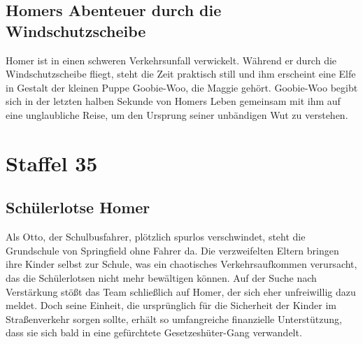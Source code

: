 
\subsection{Homers Abenteuer durch die Windschutzscheibe}\label{OABF13}
Homer ist in einen schweren Verkehrsunfall verwickelt. Während er durch die Windschutzscheibe fliegt, steht die Zeit praktisch still und ihm erscheint eine Elfe in Gestalt der kleinen Puppe Goobie-Woo, die Maggie gehört. Goobie-Woo begibt sich in der letzten halben Sekunde von Homers Leben gemeinsam mit ihm auf eine unglaubliche Reise, um den Ursprung seiner unbändigen Wut zu verstehen.


\section{Staffel 35}

\subsection{Schülerlotse Homer}
Als Otto, der Schulbusfahrer, plötzlich spurlos verschwindet, steht die Grundschule von Springfield ohne Fahrer da. Die verzweifelten Eltern bringen ihre Kinder selbst zur Schule, was ein chaotisches Verkehrsaufkommen verursacht, das die Schülerlotsen nicht mehr bewältigen können. Auf der Suche nach Verstärkung stößt das Team schließlich auf Homer, der sich eher unfreiwillig dazu meldet. Doch seine Einheit, die ursprünglich für die Sicherheit der Kinder im Straßenverkehr sorgen sollte, erhält so umfangreiche finanzielle Unterstützung, dass sie sich bald in eine gefürchtete Gesetzeshüter-Gang verwandelt.

